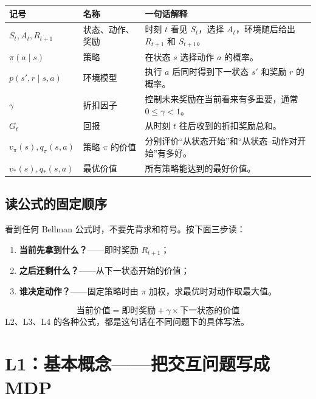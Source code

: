 \documentclass[11pt,a4paper,fontset=fandol]{ctexart}
\newcommand{\vpi}{v_{\pi}}
\newcommand{\qpi}{q_{\pi}}
\newcommand{\vstar}{v_*}
\newcommand{\qstar}{q_*}
\begin{document}
\begin{center}
\begin{tabularx}{\textwidth}{>{\centering\arraybackslash}p{}
                              >{\raggedright\arraybackslash}p{}
                              X}
\toprule
记号 & 名称 & 一句话解释\\
\midrule
\(S_t,A_t,R_{t+1}\) & 状态、动作、奖励 &
时刻 \(t\) 看见 \(S_t\)，选择 \(A_t\)，环境随后给出 \(R_{t+1}\) 和 \(S_{t+1}\)。\\
\(\pi(a\mid s)\) & 策略 &
在状态 \(s\) 选择动作 \(a\) 的概率。\\
\(p(s',r\mid s,a)\) & 环境模型 &
执行 \(a\) 后同时得到下一状态 \(s'\) 和奖励 \(r\) 的概率。\\
\(\gamma\) & 折扣因子 &
控制未来奖励在当前看来有多重要，通常 \(0\leq\gamma<1\)。\\
\(G_t\) & 回报 &
从时刻 \(t\) 往后收到的折扣奖励总和。\\
\(\vpi(s),\qpi(s,a)\) & 策略 \(\pi\) 的价值 &
分别评价“从状态开始”和“从状态--动作对开始”有多好。\\
\(\vstar(s),\qstar(s,a)\) & 最优价值 &
所有策略能达到的最好价值。\\
\bottomrule
\end{tabularx}
\end{center}

\subsection*{读公式的固定顺序}

看到任何 Bellman 公式时，不要先背求和符号。按下面三步读：

\begin{enumerate}
  \item \textbf{当前先拿到什么？}——即时奖励 \(R_{t+1}\)；
  \item \textbf{之后还剩什么？}——从下一状态开始的价值；
  \item \textbf{谁决定动作？}——固定策略时由 \(\pi\) 加权，求最优时对动作取最大值。
\end{enumerate}

\begin{memorybox}[全书最重要的一句话]
\[
\boxed{\text{当前价值}
=\text{即时奖励}
+\gamma\times\text{下一状态的价值}}
\]
L2、L3、L4 的各种公式，都是这句话在不同问题下的具体写法。
\end{memorybox}

\clearpage
\section{L1：基本概念——把交互问题写成 MDP}
\end{document}
